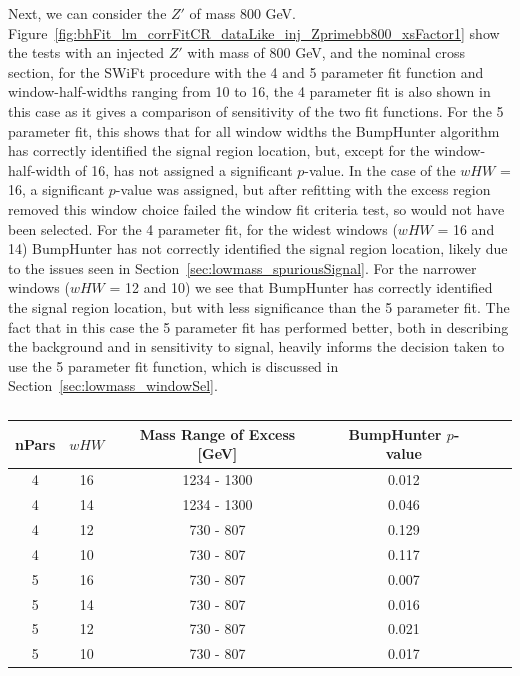 Next, we can consider the $Z'$ of mass 800 GeV.
Figure~\ref{fig:bhFit_lm_corrFitCR_dataLike_inj_Zprimebb800_xsFactor1} show the tests with an injected $Z'$ with mass of 800 GeV, and the nominal cross section,
for the SWiFt procedure with the 4 and 5 parameter fit function and window-half-widths ranging from 10 to 16,
the 4 parameter fit is also shown in this case as it gives a comparison of sensitivity of the two fit functions.
For the 5 parameter fit, this shows that for all window widths the {\sc BumpHunter} algorithm has correctly identified the signal region location,
but, except for the window-half-width of 16, has not assigned a significant $p$-value.
In the case of the $wHW$ = 16, a significant $p$-value was assigned,
but after refitting with the excess region removed this window choice failed the window fit criteria test, so would not have been selected.
For the 4 parameter fit, for the widest windows ($wHW$ = 16 and 14) {\sc BumpHunter} has not correctly identified the signal region location,
likely due to the issues seen in Section~\ref{sec:lowmass_spuriousSignal}.
For the narrower windows ($wHW$ = 12 and 10) we see that {\sc BumpHunter} has correctly identified the signal region location, but with less significance than the 5 parameter fit.
The fact that in this case the 5 parameter fit has performed better, both in describing the background and in sensitivity to signal,
heavily informs the decision taken to use the 5 parameter fit function, which is discussed in Section~\ref{sec:lowmass_windowSel}.

\begin{table}[!ht]
\centering
\begin{tabular}{|c|c||c|c|c|c|}
  \hline
  nPars & $wHW$  &  Mass Range of Excess [GeV]  &  BumpHunter $p$-value \\
  \hline
   4    & 16   &  1234 - 1300 &  0.012 \\
   4    & 14   &  1234 - 1300 &  0.046 \\
   4    & 12   &   730 - 807  &  0.129 \\
   4    & 10   &   730 - 807  &  0.117 \\
  \hline
   5    & 16   &   730 - 807  &  0.007 \\
   5    & 14   &   730 - 807  &  0.016 \\
   5    & 12   &   730 - 807  &  0.021 \\
   5    & 10   &   730 - 807  &  0.017 \\
  \hline
\end{tabular}
\vspace{10pt}
\caption{\label{tab:bumpH_lm_sigInj_800}}
\end{table}

